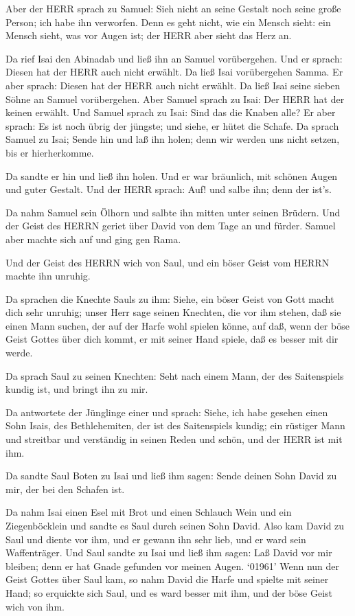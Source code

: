  Aber der HERR sprach zu Samuel: Sieh nicht an seine Gestalt
noch seine große Person; ich habe ihn verworfen. Denn es geht nicht, wie
ein Mensch sieht: ein Mensch sieht, was vor Augen ist; der HERR aber
sieht das Herz an.

 Da rief Isai den Abinadab und ließ ihn an Samuel
vorübergehen. Und er sprach: Diesen hat der HERR auch nicht erwählt.
 Da ließ Isai vorübergehen Samma. Er aber sprach: Diesen hat
der HERR auch nicht erwählt.  Da ließ Isai seine sieben
Söhne an Samuel vorübergehen. Aber Samuel sprach zu Isai: Der HERR hat
der keinen erwählt.  Und Samuel sprach zu Isai: Sind das
die Knaben alle? Er aber sprach: Es ist noch übrig der jüngste; und
siehe, er hütet die Schafe. Da sprach Samuel zu Isai; Sende hin und laß
ihn holen; denn wir werden uns nicht setzen, bis er hierherkomme.

 Da sandte er hin und ließ ihn holen. Und er war bräunlich,
mit schönen Augen und guter Gestalt. Und der HERR sprach: Auf! und salbe
ihn; denn der ist's.

 Da nahm Samuel sein Ölhorn und salbte ihn mitten unter
seinen Brüdern. Und der Geist des HERRN geriet über David von dem Tage
an und fürder. Samuel aber machte sich auf und ging gen Rama.

 Und der Geist des HERRN wich von Saul, und ein böser Geist
vom HERRN machte ihn unruhig.

 Da sprachen die Knechte Sauls zu ihm: Siehe, ein böser
Geist von Gott macht dich sehr unruhig;  unser Herr sage
seinen Knechten, die vor ihm stehen, daß sie einen Mann suchen, der auf
der Harfe wohl spielen könne, auf daß, wenn der böse Geist Gottes über
dich kommt, er mit seiner Hand spiele, daß es besser mit dir werde.

 Da sprach Saul zu seinen Knechten: Seht nach einem Mann,
der des Saitenspiels kundig ist, und bringt ihn zu mir.

 Da antwortete der Jünglinge einer und sprach: Siehe, ich
habe gesehen einen Sohn Isais, des Bethlehemiten, der ist des
Saitenspiels kundig; ein rüstiger Mann und streitbar und verständig in
seinen Reden und schön, und der HERR ist mit ihm.

 Da sandte Saul Boten zu Isai und ließ ihm sagen: Sende
deinen Sohn David zu mir, der bei den Schafen ist.

 Da nahm Isai einen Esel mit Brot und einen Schlauch Wein
und ein Ziegenböcklein und sandte es Saul durch seinen Sohn David.
 Also kam David zu Saul und diente vor ihm, und er gewann
ihn sehr lieb, und er ward sein Waffenträger.  Und Saul
sandte zu Isai und ließ ihm sagen: Laß David vor mir bleiben; denn er
hat Gnade gefunden vor meinen Augen.  `01961' Wenn nun der
Geist Gottes über Saul kam, so nahm David die Harfe und spielte mit
seiner Hand; so erquickte sich Saul, und es ward besser mit ihm, und der
böse Geist wich von ihm.

